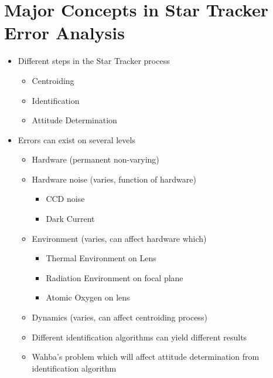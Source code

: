 \chapter{Major Concepts in Star Tracker Error Analysis}
\begin{itemize}
    \item Different steps in the Star Tracker process
    \begin{itemize}
        \item Centroiding
        \item Identification
        \item Attitude Determination
    \end{itemize}
    \item Errors can exist on several levels
    \begin{itemize}
        \item Hardware (permanent non-varying)
        \item Hardware noise (varies, function of hardware)
        \begin{itemize}
            \item CCD noise 
            \item Dark Current 
        \end{itemize}
        \item Environment (varies, can affect hardware which)
        \begin{itemize}
            \item Thermal Environment on Lens
            \item Radiation Environment on focal plane 
            \item Atomic Oxygen on lens 
        \end{itemize}
        \item Dynamics (varies, can affect centroiding process)
        \item Different identification algorithms can yield different results
        \item Wahba's problem which will affect attitude determination from identification algorithm
    \end{itemize}
\end{itemize}